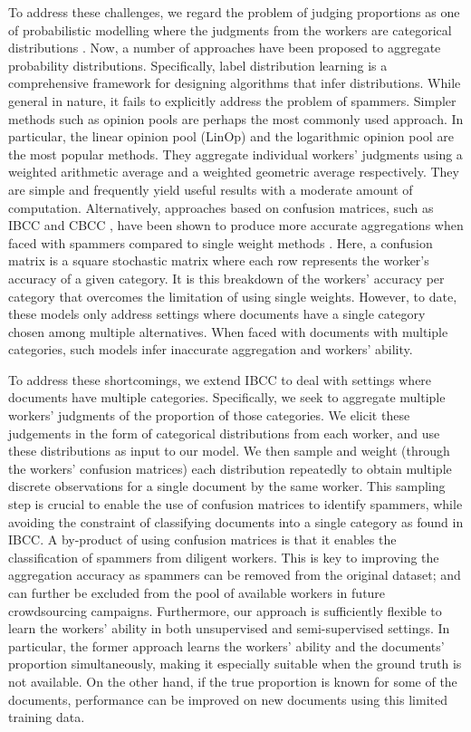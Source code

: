 \documentclass{article}
\begin{document}
\emph{}To address these challenges, we regard the problem
of judging proportions as one of probabilistic modelling where the
judgments from the workers are categorical distributions \cite{oakley_eliciting_2010,geng_label_2016}.
Now, a number of approaches have been proposed to aggregate probability
distributions. Specifically, label distribution learning \cite{geng_label_2016}
is a comprehensive framework for designing algorithms that infer
distributions.  While general in nature, it fails to explicitly
address the problem of spammers.  Simpler methods such as opinion
pools are perhaps the most commonly used approach. In particular,
the linear opinion pool (LinOp) \cite{bacharach_normal_1979} and
the logarithmic opinion pool \cite{weerahandi_multi-bayesian_1981}
are the most popular methods.
They aggregate individual workers' judgments using a weighted arithmetic
average and a weighted geometric average respectively. They are simple
and frequently yield useful results with a moderate amount of computation.
   Alternatively, approaches based on confusion matrices,
such as IBCC \cite{kim_bayesian_2012} and CBCC \cite{venanzi_community-based_2014},
have been shown to produce more accurate aggregations when faced with
spammers compared to single weight methods \cite{ipeirotis_quality_2010}.
Here, a confusion matrix is a square stochastic matrix where each
row represents the worker's accuracy of a given category. It
is this breakdown of the workers' accuracy per category that overcomes
the limitation of using single weights. However, to date, these models
only address settings where documents have a single category chosen
among multiple alternatives. When faced with documents with multiple
categories, such models infer inaccurate aggregation and workers'
ability. 

To address these shortcomings, we extend IBCC to deal with settings
where documents have multiple categories. Specifically, we seek to
aggregate multiple workers' judgments of the proportion of those categories.
We elicit these judgements in the form of categorical distributions
from each worker, and use these distributions as input to our model.
We then sample and weight (through the workers' confusion matrices)
each distribution repeatedly to obtain multiple discrete observations
for a single document by the same worker. This sampling step is
crucial to enable the use of confusion matrices to identify spammers,
while avoiding the constraint of classifying documents into a single
category as found in IBCC. A by-product of using confusion
matrices is that it enables the classification of spammers from diligent
workers. This is key to improving the aggregation accuracy as
spammers can be removed from the original dataset; and can further
be excluded from the pool of available workers in future crowdsourcing
campaigns. Furthermore, our approach is sufficiently flexible to
learn the workers' ability in both unsupervised and semi-supervised
settings. In particular, the former approach learns the workers'
ability and the documents' proportion simultaneously, making it especially
suitable when the ground truth is not available. On the other hand,
if the true proportion is known for some of the documents, performance
can be improved on new documents using this limited training data.
\end{document}
